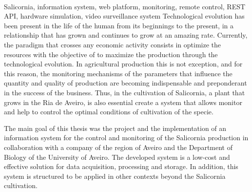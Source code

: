 \documentclass[11pt,twoside,a4paper]{report}
\begin{document}
\EndTitlePage
\titlepage\ \endtitlepage %


\TitlePage
  \vspace*{55mm}
  {Salicornia, information system, web platform, monitoring, remote control, REST API, hardware simulation, video surveillance system}
  \vspace*{5mm}
       {Technological evolution has been present in the life of the human from its beginnings to the present, in a relationship that has grown and continues to grow at an amazing rate. Currently, the paradigm that crosses any economic activity consists in optimize the resources with the objective of to maximize the production through the technological evolution. In agricultural production this is not exception, and for this reason, the monitoring mechanisms of the parameters that influence the quantity and quality of production are becoming indispensable and preponderant in the success of the business. Thus, in the cultivation of Salicornia, a plant that grows in the Ria de Aveiro, is also essential create a system that allows monitor and help to control the optimal conditions of cultivation of the specie.
       	}
       
       
         \TEXT{}
         {The main goal of this thesis was the project and the implementation of an information system for the control and monitoring of the Salicornia production in collaboration with a company of the region of Aveiro and the Department of Biology of the University of Aveiro. The developed system is a low-cost and effective solution for data acquisition, processing and storage. In addition, this system is structured to be applied in other contexts beyond the Salicornia cultivation. }
\EndTitlePage
\titlepage\ \endtitlepage %


%
%


\tableofcontents

\cleardoublepage
{}
\listoffigures



\cleardoublepage
{}
\listoftables




\cleardoublepage

\end{document}
